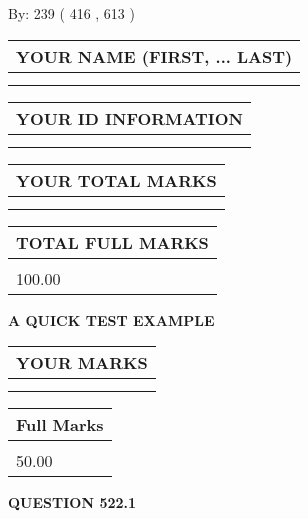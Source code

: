 \documentclass[12pt]{article}
\begin{document}
   
\hspace{1.0in} By: 
 239 ( 416 ,  613 )
   
   
   
   
\newpage 
\setcounter{page}{ 
   522001 } 
   
   
   
   
\noindent\begin{tabular}{|l|}
\hline
YOUR NAME (FIRST, ... LAST)  \\
\hline
 \\ 
 \\ 
\hline
\end{tabular}
\hspace{0.05in} \begin{tabular}{|l|}
\hline
 YOUR   ID   INFORMATION  \\
\hline
 \\ 
 \\ 
\hline
\end{tabular}
   
   
\vspace{0.2in}\noindent\begin{tabular}{|l|}
\hline
YOUR TOTAL MARKS  \\
\hline
 \\ 
 \\ 
\hline
\end{tabular}
\hspace{0.05in} \begin{tabular}{|l|}
\hline
TOTAL FULL MARKS  \\
\hline
 \\ 
100.00 \\
\hline
\end{tabular}
   
   
 \vspace{0.2in}
{\LARGE {\textbf{ A QUICK TEST EXAMPLE}}}
   
   
  
\vspace{0.2in}
  
\noindent\begin{tabular}{|l|}
\hline
 YOUR MARKS  \\
\hline
 \\ 
 \\ 
\hline
\end{tabular}
\hspace{0.05in} \begin{tabular}{|l|}
\hline
 Full Marks  \\
\hline
 \\ 
50.00 \\
\hline
\end{tabular}
{\textbf{\Large{QUESTION
522.1 
}}}
  
\end{document}
